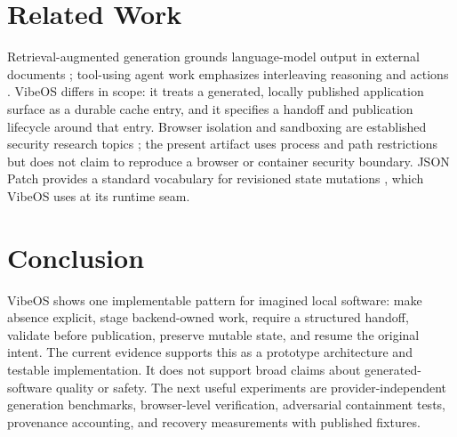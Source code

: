 \documentclass[11pt]{article}
\begin{document}
\section{Related Work}
Retrieval-augmented generation grounds language-model output in external documents \cite{lewis2020retrieval}; tool-using agent work emphasizes interleaving reasoning and actions \cite{yao2023react}. VibeOS differs in scope: it treats a generated, locally published application surface as a durable cache entry, and it specifies a handoff and publication lifecycle around that entry. Browser isolation and sandboxing are established security research topics \cite{barth2008security}; the present artifact uses process and path restrictions but does not claim to reproduce a browser or container security boundary. JSON Patch provides a standard vocabulary for revisioned state mutations \cite{rfc6902}, which VibeOS uses at its runtime seam.

\section{Conclusion}
VibeOS shows one implementable pattern for imagined local software: make absence explicit, stage backend-owned work, require a structured handoff, validate before publication, preserve mutable state, and resume the original intent. The current evidence supports this as a prototype architecture and testable implementation. It does not support broad claims about generated-software quality or safety. The next useful experiments are provider-independent generation benchmarks, browser-level verification, adversarial containment tests, provenance accounting, and recovery measurements with published fixtures.



\end{document}
